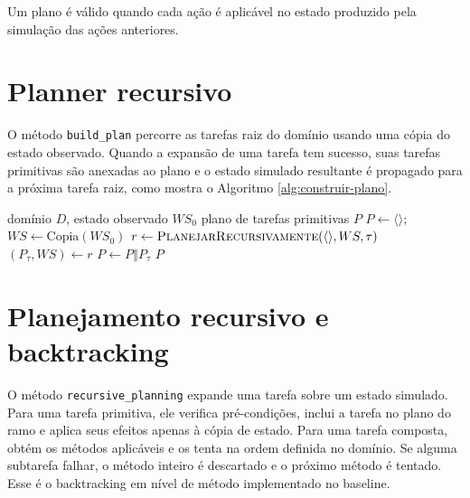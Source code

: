 Um plano é válido quando cada ação é aplicável no estado produzido pela
simulação das ações anteriores.

\section{Planner recursivo}

O método \texttt{build\_plan} percorre as tarefas raiz do domínio usando uma
cópia do estado observado. Quando a expansão de uma tarefa tem sucesso, suas
tarefas primitivas são anexadas ao plano e o estado simulado resultante é
propagado para a próxima tarefa raiz, como mostra o Algoritmo
\ref{alg:construir-plano}.

\begin{algorithm}[H]
\caption{Método \texttt{build\_plan} do baseline HTN}
\label{alg:construir-plano}
\begin{algorithmic}[1]
\Require domínio $D$, estado observado $WS_0$
\Ensure plano de tarefas primitivas $P$
\State $P \gets \langle\rangle$; $WS \gets \mathrm{Copia}(WS_0)$
  \State $r \gets \Call{PlanejarRecursivamente}{\langle\rangle, WS, \tau}$
    \State $(P_\tau, WS) \gets r$
    \State $P \gets P \mathbin{\Vert} P_\tau$
  \EndIf
\EndFor
\State \Return $P$
\end{algorithmic}
\end{algorithm}

\section{Planejamento recursivo e backtracking}

O método \texttt{recursive\_planning} expande uma tarefa sobre um estado
simulado. Para uma tarefa primitiva, ele verifica pré-condições, inclui a tarefa
no plano do ramo e aplica seus efeitos apenas à cópia de estado. Para uma tarefa
composta, obtém os métodos aplicáveis e os tenta na ordem definida no domínio.
Se alguma subtarefa falhar, o método inteiro é descartado e o próximo método é
tentado. Esse é o backtracking em nível de método implementado no baseline.

